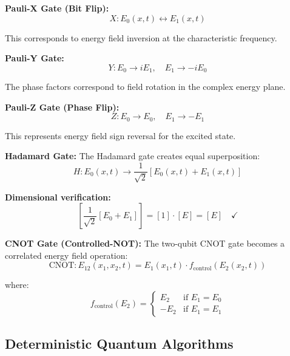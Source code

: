 \documentclass[12pt,a4paper]{report}
\begin{document}
\textbf{Pauli-X Gate (Bit Flip):}
\begin{equation}
	X: E_0(x,t) \leftrightarrow E_1(x,t)
\end{equation}

This corresponds to energy field inversion at the characteristic frequency.

\textbf{Pauli-Y Gate:}
\begin{equation}
	Y: E_0 \rightarrow iE_1, \quad E_1 \rightarrow -iE_0
\end{equation}

The phase factors correspond to field rotation in the complex energy plane.

\textbf{Pauli-Z Gate (Phase Flip):}
\begin{equation}
	Z: E_0 \rightarrow E_0, \quad E_1 \rightarrow -E_1
\end{equation}

This represents energy field sign reversal for the excited state.

\textbf{Hadamard Gate:}
The Hadamard gate creates equal superposition:
\begin{equation}
	H: E_0(x,t) \rightarrow \frac{1}{\sqrt{2}}[E_0(x,t) + E_1(x,t)]
\end{equation}

\textbf{Dimensional verification:}
\begin{equation}
	\left[\frac{1}{\sqrt{2}}[E_0 + E_1]\right] = [1] \cdot [E] = [E] \quad \checkmark
\end{equation}

\textbf{CNOT Gate (Controlled-NOT):}
The two-qubit CNOT gate becomes a correlated energy field operation:
\begin{equation}
	\text{CNOT}: E_{12}(x_1,x_2,t) = E_1(x_1,t) \cdot f_{\text{control}}(E_2(x_2,t))
\end{equation}

where:
\begin{equation}
	f_{\text{control}}(E_2) = \begin{cases}
		E_2 & \text{if } E_1 = E_0 \\
		-E_2 & \text{if } E_1 = E_1
	\end{cases}
\end{equation}

\subsection{Deterministic Quantum Algorithms}
\label{subsec:deterministic_algorithms}
\end{document}
